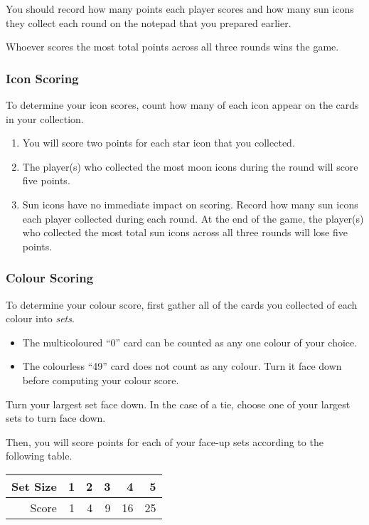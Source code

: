 \documentclass[a6paper, parskip=half, DIV=14, 10pt]{scrartcl}
\begin{document}
You should record how many points each player scores and how many sun icons they collect each round on the notepad that you prepared earlier.

Whoever scores the most total points across all three rounds wins the game.


\vfill

\subsubsection*{Icon Scoring}
To determine your icon scores, count how many of each icon appear on the cards in your collection.
\begin{enumerate}[leftmargin=*]
\item You will score two points for each star icon that you collected.
\item The player(s) who collected the most moon icons during the round will score five points.
\item Sun icons have no immediate impact on scoring. Record how many sun icons each player collected during each round. At the end of the game, the player(s) who collected the most total sun icons across all three rounds will lose five points.
\end{enumerate}

\newpage

\subsubsection*{Colour Scoring}
To determine your colour score, first gather all of the cards you collected of each colour into \emph{sets}.
\begin{itemize}[leftmargin=*]
\item The multicoloured ``0'' card can be counted as any one colour of your choice.
\item The colourless ``49'' card does not count as any colour. Turn it face down before computing your colour score.
\end{itemize}
Turn your largest set face down.
In the case of a tie, choose one of your largest sets to turn face down.

Then, you will score points for each of your face-up sets according to the following table.

\begin{center}
{
\begin{tabular}{r rrrrr} \toprule
Set Size & 1 & 2 & 3 & 4 & 5\\ \midrule
Score & \phantom{0}1 & \phantom{0}4 & \phantom{0}9 & 16 & 25\\\bottomrule
\end{tabular}
}
\end{center}
\end{document}
